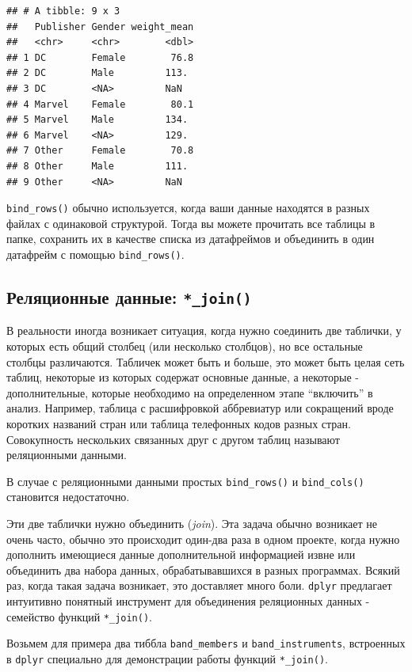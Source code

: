 \documentclass[]{book}
\begin{document}
\begin{verbatim}
## # A tibble: 9 x 3
##   Publisher Gender weight_mean
##   <chr>     <chr>        <dbl>
## 1 DC        Female        76.8
## 2 DC        Male         113. 
## 3 DC        <NA>         NaN  
## 4 Marvel    Female        80.1
## 5 Marvel    Male         134. 
## 6 Marvel    <NA>         129. 
## 7 Other     Female        70.8
## 8 Other     Male         111. 
## 9 Other     <NA>         NaN
\end{verbatim}

\texttt{bind\_rows()} обычно используется, когда ваши данные находятся в
разных файлах с одинаковой структурой. Тогда вы можете прочитать все
таблицы в папке, сохранить их в качестве списка из датафреймов и
объединить в один датафрейм с помощью \texttt{bind\_rows()}.

\subsection{\texorpdfstring{Реляционные данные:
\texttt{*\_join()}}{Реляционные данные: *\_join()}}\label{tidy_join}

В реальности иногда возникает ситуация, когда нужно соединить две
таблички, у которых есть общий столбец (или несколько столбцов), но все
остальные столбцы различаются. Табличек может быть и больше, это может
быть целая сеть таблиц, некоторые из которых содержат основные данные, а
некоторые - дополнительные, которые необходимо на определенном этапе
``включить'' в анализ. Например, таблица с расшифровкой аббревиатур или
сокращений вроде коротких названий стран или таблица телефонных кодов
разных стран. Совокупность нескольких связанных друг с другом таблиц
называют реляционными данными.

В случае с реляционными данными простых \texttt{bind\_rows()} и
\texttt{bind\_cols()} становится недостаточно.

Эти две таблички нужно объединить (\emph{join}). Эта задача обычно
возникает не очень часто, обычно это происходит один-два раза в одном
проекте, когда нужно дополнить имеющиеся данные дополнительной
информацией извне или объединить два набора данных, обрабатывавшихся в
разных программах. Всякий раз, когда такая задача возникает, это
доставляет много боли. \texttt{dplyr} предлагает интуитивно понятный
инструмент для объединения реляционных данных - семейство функций
\texttt{*\_join()}.

Возьмем для примера два тиббла \texttt{band\_members} и
\texttt{band\_instruments}, встроенных в \texttt{dplyr} специально для
демонстрации работы функций \texttt{*\_join()}.
\end{document}
